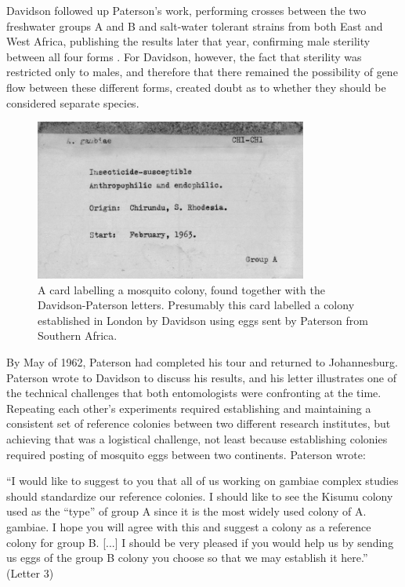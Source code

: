 \documentclass[a4paper,11pt,abstracton,hidelinks]{scrartcl}
\begin{document}
Davidson followed up Paterson's work, performing crosses between the two freshwater groups A and B and salt-water tolerant strains from both East and West Africa, publishing the results later that year, confirming male sterility between all four forms \citep{Davidson1962b}.
%
For Davidson, however, the fact that sterility was restricted only to males, and therefore that there remained the possibility of gene flow between these different forms, created doubt as to whether they should be considered separate species.


\begin{figure}[t]
\centering
\includegraphics[width=0.8\textwidth]{davidson-letters/Cards-colonies.pdf}
\caption{A card labelling a mosquito colony, found together with the Davidson-Paterson letters. Presumably this card labelled a colony established in London by Davidson using eggs sent by Paterson from Southern Africa.}
\end{figure}


By May of 1962, Paterson had completed his tour and returned to Johannesburg.
%
Paterson wrote to Davidson to discuss his results, and his letter illustrates one of the technical challenges that both entomologists were confronting at the time.
%
Repeating each other's experiments required establishing and maintaining a consistent set of reference colonies between two different research institutes, but achieving that was a logistical challenge, not least because establishing colonies required posting of mosquito eggs between two continents.
%
Paterson wrote:
\begin{displayquote}
``I would like to suggest to you that all of us working on gambiae complex studies should standardize our reference colonies.
%
I should like to see the Kisumu colony used as the ``type'' of group A since it is the most widely used colony of A. gambiae.
%
I hope you will agree with this and suggest a colony as a reference colony for group B. 
%
[...] I should be very pleased if you would help us by sending us eggs of the group B colony you choose so that we may establish it here.'' (Letter 3)
\end{displayquote}
\end{document}
